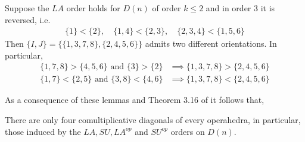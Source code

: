 \begin{example} \label{ex:Non-coherent order contradiction}
Suppose the $LA$ order holds for $D(n)$ of order $k\leq 2$ and in order $3$ it is reversed, i.e.
\begin{align*}
    \{1\}<\{2\},\quad \{1,4\}< \{2,3\}, \quad \{2, 3, 4\} < \{1, 5, 6 \}
\end{align*}
Then $\{I,J\}=\{\{1, 3, 7, 8\}, \{2, 4, 5, 6\}\}$ admits two different orientations.
In particular, 
\begin{align*}
    \{1, 7, 8\} > \{ 4, 5, 6 \} \text{ and } \{3\} > \{2\} &\implies \{1, 3, 7, 8\} >\{2, 4, 5, 6\}\\
    \{1, 7\}< \{2, 5\} \text{ and } \{3, 8\}< \{4, 6\} &\implies \{1, 3, 7, 8\} <\{2, 4, 5, 6\}
\end{align*}

\end{example}

As a consequence of these lemmas and Theorem 3.16 of \cite{LA21} it follows that, 
\begin{thm}
There are only four comultiplicative diagonals of every operahedra, in particular, those induced by the $LA, SU, LA^{op}$ and $SU^{op}$ orders on $D(n)$.
\end{thm}

